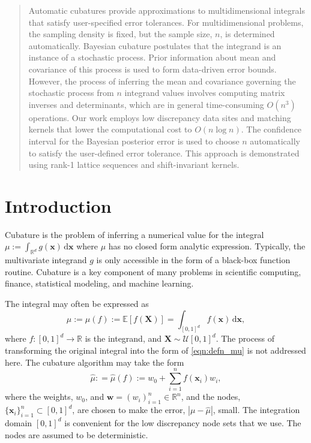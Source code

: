 \documentclass[twocolumn]{svjour3}          %
\newcommand{\bm}[1]{\boldsymbol{#1}}
\newcommand{\dif}[1]{\text{d}{#1}}
\newcommand{\reals}{\mathbb{R}}
\newcommand{\Ex}{\mathbb{E}}
\newcommand{\vw}{\bm{w}}
\newcommand{\vx}{\bm{x}}
\newcommand{\hmu}{\widehat{\mu}}
\def\abs#1{\ensuremath{\left \lvert #1 \right \rvert}}
\begin{document}
\begin{abstract}
Automatic cubatures provide approximations to multidimensional integrals that satisfy user-specified error tolerances.  For multidimensional problems, the sampling density is fixed, but the
sample size, $n$, is determined automatically. Bayesian cubature postulates that the integrand is an instance of a stochastic process.
Prior information about mean and covariance of this process is used to form data-driven error bounds.  However, the process of inferring the mean and covariance governing the stochastic process from $n$ integrand values involves computing matrix inverses and determinants,
which are in general time-consuming $O(n^3)$ operations.
Our work employs low discrepancy data sites and matching kernels that lower the  computational cost to $O(n \log n)$.  The confidence interval for the Bayesian posterior error is used to choose $n$ automatically to satisfy the user-defined error tolerance.  This approach is demonstrated using rank-1 lattice sequences and shift-invariant kernels.


\end{abstract}

\section{Introduction}
\label{intro}
Cubature is the problem of inferring a numerical value for the integral 
$ \mu := \int_{\reals^d} g(\vx) \, \dif \vx$ where $\mu$ has no closed form analytic expression. Typically, the multivariate integrand $g$ is only accessible in the form of a black-box function routine. 
Cubature is a key component of many problems in scientific computing, finance, statistical modeling, and machine learning.  

The integral may often be expressed as
\begin{equation}
\label{eqn:defn_mu}
\mu:= \mu(f) := \Ex[f(\boldsymbol{X})] = \int_{[0,1]^d} f(\vx)\, \dif\vx, 
\end{equation}
where $f:[0,1]^d \to \reals$ is the integrand, and $\boldsymbol{X} \sim \mathcal{U}[0,1]^d$.  The process of transforming the original integral into the form of \eqref{eqn:defn_mu}  is not addressed here.  The cubature algorithm may take the form
\begin{equation}
\label{eqn:defn_hmu}  %
\hmu: = \hmu(f) := w_0 + \sum_{i=1}^{n} f(\vx_i) w_i,
\end{equation}
where the weights, $w_0$, and  $\vw = (w_i)_{i=1}^n \in \reals^n$, and the nodes, $\{\vx_i\}_{i=1}^n \subset [0,1]^d$, are chosen to make the error, $\abs{\mu - \hmu}$, small. The integration domain $[0,1]^d$ is convenient for the low discrepancy node sets that we use.  The nodes are assumed to be deterministic.
\end{document}
